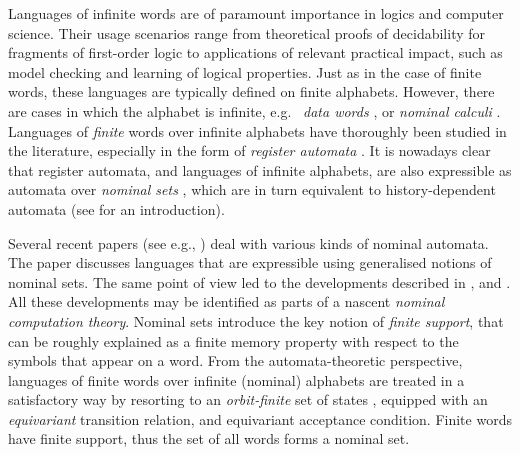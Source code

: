 

Languages of infinite words are of paramount importance in logics and computer science. Their usage scenarios range from theoretical proofs of decidability for fragments of first-order logic
%
%
 to applications of relevant practical impact, such as model checking and learning of logical properties. Just as in the case of finite words, these languages are typically defined on finite alphabets. However, there are cases in which the alphabet is infinite, e.g.\
\emph{data words} \cite{TODO}, or \emph{nominal calculi} \cite{Pi-calculus}. Languages of \emph{finite} words over infinite alphabets have thoroughly been studied in the literature, especially in the form of \emph{register automata} \cite{KAMINKSIFRANCEZ,SEGOUFIN?,NIKOS}. 
%
%
It is nowadays clear that register automata, and languages of infinite alphabets, are also expressible as automata over \emph{nominal sets} \cite{GabbayPitts}, which are in turn equivalent  to history-dependent automata \cite{PISTORE,GADDUCCI,STATON,CIANCIA} (see \cite{CianciaTuostoTR} for an introduction). 
\todo{Si può citare qualcosa di Daniela?}

Several recent papers (see e.g., \cite{TOMOYUKI,GABBAYCIANCIA}) deal with various kinds of nominal automata. The paper \cite{MikLICS} discusses languages that are expressible using generalised notions of nominal sets. The same point of view led to the developments described in \cite{MikPOPL12}, and \cite{PittsPOPL13}. All these developments may be identified as parts of a nascent
%
% 
\emph{nominal computation theory}. Nominal sets introduce the key notion of \emph{finite support}, that can be roughly explained as a finite memory property with respect to the symbols that appear on a word. From the automata-theoretic perspective, languages of finite words over infinite (nominal) alphabets are treated in a satisfactory way by resorting to an \emph{orbit-finite} set of states \cite{CianciaMontanariIC?}, equipped with an \emph{equivariant} transition relation, and equivariant acceptance condition. Finite words have finite support, thus the set of all words forms a nominal set. 

